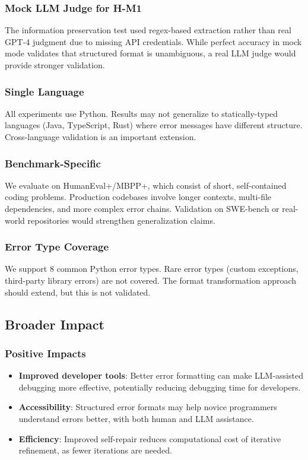 \subsubsection{Mock LLM Judge for H-M1}

The information preservation test used regex-based extraction rather than real GPT-4 judgment due to missing API credentials. While perfect accuracy in mock mode validates that structured format is unambiguous, a real LLM judge would provide stronger validation.

\subsubsection{Single Language}

All experiments use Python. Results may not generalize to statically-typed languages (Java, TypeScript, Rust) where error messages have different structure. Cross-language validation is an important extension.

\subsubsection{Benchmark-Specific}

We evaluate on HumanEval+/MBPP+, which consist of short, self-contained coding problems. Production codebases involve longer contexts, multi-file dependencies, and more complex error chains. Validation on SWE-bench or real-world repositories would strengthen generalization claims.

\subsubsection{Error Type Coverage}

We support 8 common Python error types. Rare error types (custom exceptions, third-party library errors) are not covered. The format transformation approach should extend, but this is not validated.

\subsection{Broader Impact}

\subsubsection{Positive Impacts}

\begin{itemize}
    \item \textbf{Improved developer tools}: Better error formatting can make LLM-assisted debugging more effective, potentially reducing debugging time for developers.
    \item \textbf{Accessibility}: Structured error formats may help novice programmers understand errors better, with both human and LLM assistance.
    \item \textbf{Efficiency}: Improved self-repair reduces computational cost of iterative refinement, as fewer iterations are needed.
\end{itemize}

